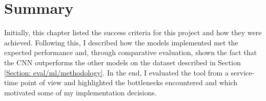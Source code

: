 		\section{Summary} \label{Section: eval/summary}
			Initially, this chapter listed the success criteria for this project and how they were achieved. Following this, I described how the models implemented met the expected performance and, through comparative evaluation, shown the fact that the CNN outperforms the other models on the dataset described in Section \ref{Section: eval/ml/methodology}. In the end, I evaluated the tool from a service-time point of view and highlighted the bottlenecks encountered and which motivated some of my implementation decisions. 
